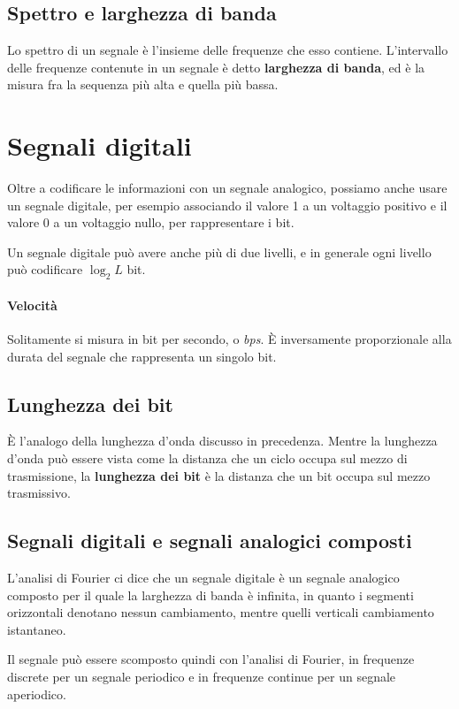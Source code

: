     \subsection{Spettro e larghezza di banda}
        Lo spettro di un segnale è l'insieme delle frequenze che esso contiene. L'intervallo delle frequenze contenute in un segnale è detto \textbf{larghezza di banda}, ed è la misura fra la sequenza più alta e quella più bassa.
        
\section{Segnali digitali}
    Oltre a codificare le informazioni con un segnale analogico, possiamo anche usare un segnale digitale, per esempio associando il valore 1 a un voltaggio positivo e il valore 0 a un voltaggio nullo, per rappresentare i bit.
    
    Un segnale digitale può avere anche più di due livelli, e in generale ogni livello può codificare $\log_2L$ bit.
    
    \paragraph{Velocità}
        Solitamente si misura in bit per secondo, o \textit{bps}. È inversamente proporzionale alla durata del segnale che rappresenta un singolo bit.
        
    \subsection{Lunghezza dei bit}
        È l'analogo della lunghezza d'onda discusso in precedenza. Mentre la lunghezza d'onda può essere vista come la distanza che un ciclo occupa sul mezzo di trasmissione, la \textbf{lunghezza dei bit} è la distanza che un bit occupa sul mezzo trasmissivo.
        
    \subsection{Segnali digitali e segnali analogici composti}
        L'analisi di Fourier ci dice che un segnale digitale è un segnale analogico composto per il quale la larghezza di banda è infinita, in quanto i segmenti orizzontali denotano nessun cambiamento, mentre quelli verticali cambiamento istantaneo.
        
        Il segnale può essere scomposto quindi con l'analisi di Fourier, in frequenze discrete per un segnale periodico e in frequenze continue per un segnale aperiodico.
        
